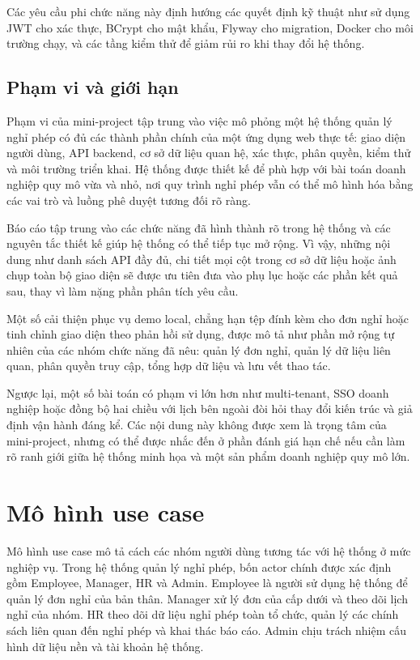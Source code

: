 Các yêu cầu phi chức năng này định hướng các quyết định kỹ thuật như sử dụng JWT cho xác thực, BCrypt cho mật khẩu, Flyway cho migration, Docker cho môi trường chạy, và các tầng kiểm thử để giảm rủi ro khi thay đổi hệ thống.

\subsection{Phạm vi và giới hạn}
Phạm vi của mini-project tập trung vào việc mô phỏng một hệ thống quản lý nghỉ phép có đủ các thành phần chính của một ứng dụng web thực tế: giao diện người dùng, API backend, cơ sở dữ liệu quan hệ, xác thực, phân quyền, kiểm thử và môi trường triển khai. Hệ thống được thiết kế để phù hợp với bài toán doanh nghiệp quy mô vừa và nhỏ, nơi quy trình nghỉ phép vẫn có thể mô hình hóa bằng các vai trò và luồng phê duyệt tương đối rõ ràng.

Báo cáo tập trung vào các chức năng đã hình thành rõ trong hệ thống và các nguyên tắc thiết kế giúp hệ thống có thể tiếp tục mở rộng. Vì vậy, những nội dung như danh sách API đầy đủ, chi tiết mọi cột trong cơ sở dữ liệu hoặc ảnh chụp toàn bộ giao diện sẽ được ưu tiên đưa vào phụ lục hoặc các phần kết quả sau, thay vì làm nặng phần phân tích yêu cầu.

Một số cải thiện phục vụ demo local, chẳng hạn tệp đính kèm cho đơn nghỉ hoặc tinh chỉnh giao diện theo phản hồi sử dụng, được mô tả như phần mở rộng tự nhiên của các nhóm chức năng đã nêu: quản lý đơn nghỉ, quản lý dữ liệu liên quan, phân quyền truy cập, tổng hợp dữ liệu và lưu vết thao tác.

Ngược lại, một số bài toán có phạm vi lớn hơn như multi-tenant, SSO doanh nghiệp hoặc đồng bộ hai chiều với lịch bên ngoài đòi hỏi thay đổi kiến trúc và giả định vận hành đáng kể. Các nội dung này không được xem là trọng tâm của mini-project, nhưng có thể được nhắc đến ở phần đánh giá hạn chế nếu cần làm rõ ranh giới giữa hệ thống minh họa và một sản phẩm doanh nghiệp quy mô lớn.

\section{Mô hình use case}
Mô hình use case mô tả cách các nhóm người dùng tương tác với hệ thống ở mức nghiệp vụ. Trong hệ thống quản lý nghỉ phép, bốn actor chính được xác định gồm Employee, Manager, HR và Admin. Employee là người sử dụng hệ thống để quản lý đơn nghỉ của bản thân. Manager xử lý đơn của cấp dưới và theo dõi lịch nghỉ của nhóm. HR theo dõi dữ liệu nghỉ phép toàn tổ chức, quản lý các chính sách liên quan đến nghỉ phép và khai thác báo cáo. Admin chịu trách nhiệm cấu hình dữ liệu nền và tài khoản hệ thống.

